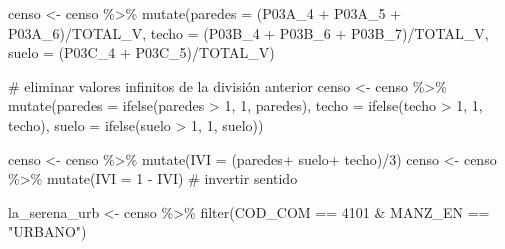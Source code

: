 \documentclass[
  letterpaper,
  DIV=11,
  numbers=noendperiod]{scrreprt}
\newenvironment{Shaded}{\begin{snugshade}}{\end{snugshade}}
\newcommand{\AttributeTok}[1]{\textcolor[rgb]{0.40,0.45,0.13}{#1}}
\newcommand{\CommentTok}[1]{\textcolor[rgb]{0.37,0.37,0.37}{#1}}
\newcommand{\DecValTok}[1]{\textcolor[rgb]{0.68,0.00,0.00}{#1}}
\newcommand{\FunctionTok}[1]{\textcolor[rgb]{0.28,0.35,0.67}{#1}}
\newcommand{\NormalTok}[1]{\textcolor[rgb]{0.00,0.23,0.31}{#1}}
\newcommand{\OtherTok}[1]{\textcolor[rgb]{0.00,0.23,0.31}{#1}}
\newcommand{\SpecialCharTok}[1]{\textcolor[rgb]{0.37,0.37,0.37}{#1}}
\newcommand{\StringTok}[1]{\textcolor[rgb]{0.13,0.47,0.30}{#1}}
\begin{document}
\begin{Shaded}
\begin{Highlighting}[]
\NormalTok{censo }\OtherTok{\textless{}{-}}\NormalTok{ censo }\SpecialCharTok{\%\textgreater{}\%}
  \FunctionTok{mutate}\NormalTok{(}\AttributeTok{paredes =}\NormalTok{ (P03A\_4 }\SpecialCharTok{+}\NormalTok{ P03A\_5 }\SpecialCharTok{+}\NormalTok{ P03A\_6)}\SpecialCharTok{/}\NormalTok{TOTAL\_V,}
         \AttributeTok{techo =}\NormalTok{ (P03B\_4 }\SpecialCharTok{+}\NormalTok{ P03B\_6 }\SpecialCharTok{+}\NormalTok{ P03B\_7)}\SpecialCharTok{/}\NormalTok{TOTAL\_V,}
         \AttributeTok{suelo =}\NormalTok{ (P03C\_4 }\SpecialCharTok{+}\NormalTok{  P03C\_5)}\SpecialCharTok{/}\NormalTok{TOTAL\_V)}

\CommentTok{\# eliminar valores infinitos de la división anterior}
\NormalTok{censo }\OtherTok{\textless{}{-}}\NormalTok{ censo }\SpecialCharTok{\%\textgreater{}\%}
  \FunctionTok{mutate}\NormalTok{(}\AttributeTok{paredes =} \FunctionTok{ifelse}\NormalTok{(paredes }\SpecialCharTok{\textgreater{}} \DecValTok{1}\NormalTok{, }\DecValTok{1}\NormalTok{, paredes), }
         \AttributeTok{techo =} \FunctionTok{ifelse}\NormalTok{(techo }\SpecialCharTok{\textgreater{}} \DecValTok{1}\NormalTok{, }\DecValTok{1}\NormalTok{, techo), }
         \AttributeTok{suelo =} \FunctionTok{ifelse}\NormalTok{(suelo }\SpecialCharTok{\textgreater{}} \DecValTok{1}\NormalTok{, }\DecValTok{1}\NormalTok{, suelo))}

\NormalTok{censo }\OtherTok{\textless{}{-}}\NormalTok{ censo }\SpecialCharTok{\%\textgreater{}\%}  \FunctionTok{mutate}\NormalTok{(}\AttributeTok{IVI =}\NormalTok{ (paredes}\SpecialCharTok{+}\NormalTok{ suelo}\SpecialCharTok{+}\NormalTok{ techo)}\SpecialCharTok{/}\DecValTok{3}\NormalTok{)}
\NormalTok{censo }\OtherTok{\textless{}{-}}\NormalTok{ censo }\SpecialCharTok{\%\textgreater{}\%}  \FunctionTok{mutate}\NormalTok{(}\AttributeTok{IVI =}  \DecValTok{1} \SpecialCharTok{{-}}\NormalTok{ IVI) }\CommentTok{\# invertir sentido}
\end{Highlighting}
\end{Shaded}

\begin{Shaded}
\begin{Highlighting}[]
\NormalTok{la\_serena\_urb }\OtherTok{\textless{}{-}}\NormalTok{ censo }\SpecialCharTok{\%\textgreater{}\%} \FunctionTok{filter}\NormalTok{(COD\_COM }\SpecialCharTok{==} \DecValTok{4101} \SpecialCharTok{\&}\NormalTok{ MANZ\_EN }\SpecialCharTok{==} \StringTok{"URBANO"}\NormalTok{)}
\end{Highlighting}
\end{Shaded}
\end{document}
